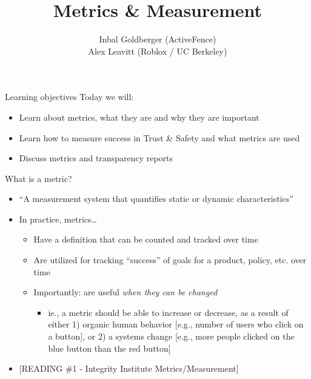 \documentclass[nobackground,dvipsnames,table]{beamer}
\title[Metrics \& Measurement]{Metrics \& Measurement}
\author[Goldberger and Leavitt]{Inbal Goldberger (ActiveFence) \\ Alex Leavitt (Roblox / UC Berkeley)}
\date[]{}
\begin{document}

\begin{frame}
	\titlepage
\end{frame}

\begin{frame}{Learning objectives}
Today we will:
\begin{itemize}
    \item Learn about metrics, what they are and why they are important
    \item Learn how to measure success in Trust \& Safety and what metrics are used
    \item Discuss metrics and transparency reports
\end{itemize}
\end{frame}

\begin{frame}{What is a metric?}

\begin{itemize}
    \item “A measurement system that quantifies static or dynamic characteristics”
    \item In practice, metrics…

    \begin{itemize}
        \item Have a definition that can be counted and tracked over time
        \item Are utilized for tracking “success” of goals for a product, policy, etc. over time
        \item Importantly: are useful \emph{when they can be changed}

        \begin{itemize}
            \item ie., a metric should be able to increase or decrease, as a result of either 1) organic human behavior {[e.g., number of users who click on a button]}, or 2) a systems change {[e.g., more people clicked on the blue button than the red button]}
        \end{itemize}
    \end{itemize}
    
    \item {[READING \#1 - Integrity Institute Metrics/Measurement]}
\end{itemize}

\end{frame}
\end{document}
